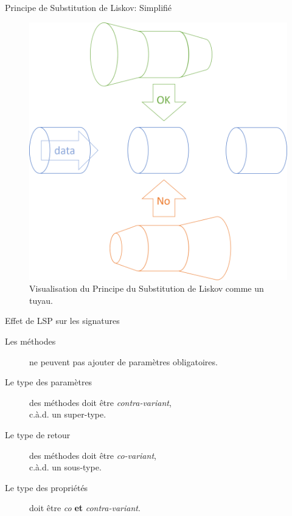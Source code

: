\documentclass[10pt]{beamer}
\begin{document}
\begin{frame}{Principe de Substitution de Liskov: Simplifié}
    \begin{figure}
    \includegraphics{lsp-pipes.png}
    \caption{
        Visualisation du Principe du Substitution de Liskov comme un tuyau. \cite{seemann_liskov_2021}
    }
  \end{figure}
\end{frame}
\begin{frame}{Effet de LSP sur les signatures}
    \begin{description}
        \item[Les méthodes] ne peuvent pas ajouter de paramètres obligatoires.
        \item[Le type des paramètres] des méthodes doit être \emph{contra-variant},\\c.à.d. un super-type.
        \item[Le type de retour] des méthodes doit être \emph{co-variant},\\c.à.d. un sous-type.
        \item[Le type des propriétés] doit être \emph{co} \textbf{et} \emph{contra-variant}.
    \end{description}
\end{frame}
\end{document}
